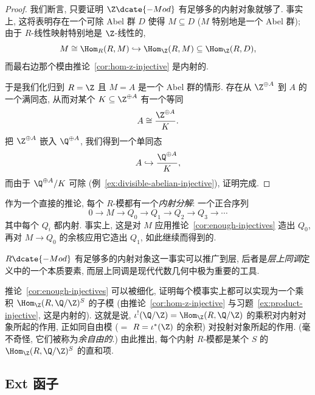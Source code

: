 \begin{proof}
我们断言, 只要证明 $\Z\dcate{-Mod}$ 有足够多的内射对象就够了. 事实上, 这将表明存在一个可除 Abel 群 $D$ 使得 $M\subseteq D$ ($M$ 特别地是一个 Abel 群); 由于 $R$-线性映射特别地是 $\Z$-线性的,
\[
M\cong\Hom_R(R,M)\hookrightarrow\Hom_\Z(R,M)\subseteq\Hom_\Z(R,D),
\]
而最右边那个模由推论~\ref{cor:hom-z-injective} 是内射的.

于是我们化归到 $R=\Z$ 且 $M=A$ 是一个 Abel 群的情形. 存在从 $\Z^{\oplus A}$ 到 $A$ 的一个满同态, 从而对某个 $K\subseteq\Z^{\oplus A}$ 有一个等同
\[
A\cong\frac{\Z^{\oplus A}}{K}.
\]
把 $\Z^{\oplus A}$ 嵌入 $\Q^{\oplus A}$, 我们得到一个单同态
\[
A\hookrightarrow\frac{\Q^{\oplus A}}{K},
\]
而由于 $\Q^{\oplus A}/K$ 可除 (例~\ref{ex:divisible-abelian-injective}), 证明完成.
\end{proof}

作为一个直接的推论, 每个 $R$-模都有一个\emph{内射分解}: 一个正合序列
\[
0\longrightarrow M\longrightarrow Q_0\longrightarrow Q_1\longrightarrow Q_2\longrightarrow Q_3\longrightarrow\cdots
\]
其中每个 $Q_i$ 都内射. 事实上, 这是对 $M$ 应用推论~\ref{cor:enough-injectives} 造出 $Q_0$, 再对 $M\to Q_0$ 的余核应用它造出 $Q_1$, 如此继续而得到的.

$R\dcate{-Mod}$ 有足够多的内射对象这一事实可以推广到层, 后者是\emph{层上同调}定义中的一个本质要素, 而层上同调是现代代数几何中极为重要的工具.

\begin{remark}\label{rmk:cofree}
推论~\ref{cor:enough-injectives} 可以被细化, 证明每个模事实上都可以实现为一个乘积 $\Hom_\Z(R,\Q/\Z)^S$ 的子模 (由推论~\ref{cor:hom-z-injective} 与习题~\ref{ex:product-injective}, 这是内射的). 这就是说, $\iota^!(\Q/\Z)=\Hom_\Z(R,\Q/\Z)$ 的乘积对内射对象所起的作用, 正如同自由模 ($=$ $R=\iota^*(\Z)$ 的余积) 对投射对象所起的作用. (毫不奇怪, 它们被称为\emph{余自由的}.) 由此推出, 每个内射 $R$-模都是某个 $S$ 的 $\Hom_\Z(R,\Q/\Z)^S$ 的直和项.
\end{remark}

\subsection{Ext 函子}\label{subsec:ext-functors}

